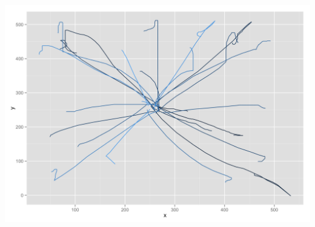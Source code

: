 \begin{appendices}
\begin{minipage}{\textwidth}
\begin{minipage}{0.5\linewidth}
	\end{minipage}
	\begin{minipage}{0.5\linewidth}
		\includegraphics[width=\linewidth]{images/plots/plot_analysis_qualitative_219}
	\end{minipage}
	\label{fig:kvaliativ_persons_3}
\end{minipage}


\end{appendices}
